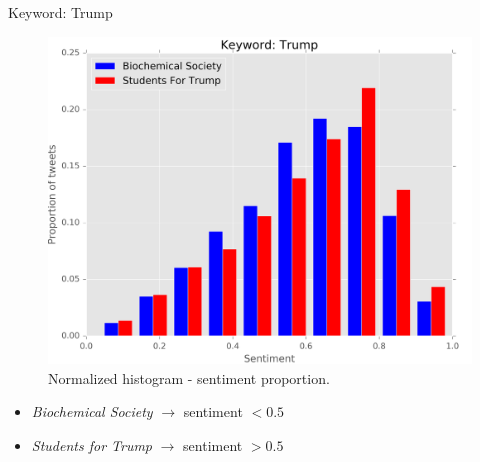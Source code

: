 \documentclass[notheorems,12pt]{beamer}
\begin{document}
\begin{frame}{Keyword: Trump}
    \begin{figure}
        \centering
        \includegraphics[scale=0.37]{./Pics/trump-normed.png}
        \vspace{-0.2cm}
        \caption*{Normalized histogram - sentiment proportion.}
    \end{figure}
    \vspace{-0.4cm}
	\begin{itemize}
        \item \textit{Biochemical Society} $\rightarrow$ sentiment $< 0.5$
		\item \textit{Students for Trump} $\rightarrow$ sentiment $> 0.5$
	\end{itemize}
\end{frame}
\end{document}
